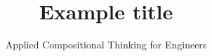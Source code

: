 \title{Example title}

\subtitle{Applied Compositional Thinking for Engineers}

\date{}



\institute[ETHZ]
{
        \begin{center}
        \end{center}
}

